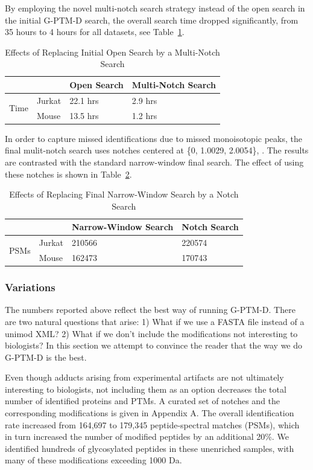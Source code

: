 \documentclass[journal=jprobs,manuscript=article]{achemso}
\begin{document}
By employing the novel multi-notch search strategy instead of the open search in the initial G-PTM-D search, the overall search time dropped significantly, from 35 hours to 4 hours for all datasets, see Table~\ref{my-labelff}.

\begin{table}[]
\centering
\caption{Effects of Replacing Initial Open Search by a Multi-Notch Search}
\label{my-labelff}
\begin{tabular}{ll|l|l}
                      &        & Open Search & Multi-Notch Search\\
\hline
\multirow{2}{*}{Time} & Jurkat & 22.1 hrs         & 2.9 hrs    \\
                      & Mouse  & 13.5 hrs         & 1.2 hrs   \\
\end{tabular}
\end{table}

In order to capture missed identifications due to missed monoisotopic peaks, the final mulit-notch search uses notches centered at \{0, 1.0029, 2.0054\}, .
The results are contrasted with the standard narrow-window final search.
The effect of using these notches is shown in Table~\ref{tab:table2}.

\begin{table}[]
\centering
\caption{Effects of Replacing Final Narrow-Window Search by a Notch Search}
\label{tab:table2}
\begin{tabular}{ll|l|l}
                      &        & Narrow-Window Search & Notch Search\\
\hline
\multirow{2}{*}{PSMs} & Jurkat  & 210566   &  220574  \\
                      & Mouse    & 162473   &   170743
\end{tabular}
\end{table}

\subsubsection{Variations}

The numbers reported above reflect the best way of running G-PTM-D.
There are two natural questions that arise: 1) What if we use a FASTA file instead of a unimod XML? 2) What if we don't include the modifications not interesting to biologists?
In this section we attempt to convince the reader that the way we do G-PTM-D is the best.

Even though adducts arising from experimental artifacts are not ultimately interesting to biologists, not including them as an option decreases the total number of identified proteins and PTMs.
A curated set of notches and the corresponding modifications is given in Appendix A.
The overall identification rate increased from 164,697 to 179,345 peptide-spectral matches (PSMs), which in turn increased the number of modified peptides by an additional 20\%.
We identified hundreds of glycosylated peptides in these unenriched samples, with many of these modifications exceeding 1000 Da.
\end{document}
